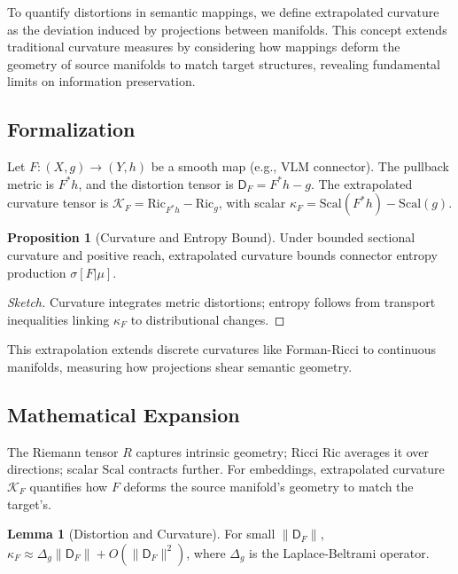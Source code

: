 \documentclass{article}
\theoremstyle{definition}
\newtheorem{lemma}[theorem]{Lemma}
\newtheorem{proposition}[theorem]{Proposition}
\begin{document}
To quantify distortions in semantic mappings, we define extrapolated curvature as the deviation induced by projections between manifolds. This concept extends traditional curvature measures by considering how mappings deform the geometry of source manifolds to match target structures, revealing fundamental limits on information preservation.

\subsection{Formalization}

Let $F: (X, g) \to (Y, h)$ be a smooth map (e.g., VLM connector). The pullback metric is $F^* h$, and the distortion tensor is $\mathsf{D}_F = F^* h - g$. The extrapolated curvature tensor is $\mathcal{K}_F = \mathrm{Ric}_{F^* h} - \mathrm{Ric}_g$, with scalar $\kappa_F = \mathrm{Scal}(F^* h) - \mathrm{Scal}(g)$.

\begin{proposition}[Curvature and Entropy Bound]
Under bounded sectional curvature and positive reach, extrapolated curvature bounds connector entropy production $\sigma[F|\mu]$.
\end{proposition}

\begin{proof}[Sketch]
Curvature integrates metric distortions; entropy follows from transport inequalities linking $\kappa_F$ to distributional changes.
\end{proof}

This extrapolation extends discrete curvatures like Forman-Ricci \cite{forman2003bochner} to continuous manifolds, measuring how projections shear semantic geometry.

\subsection{Mathematical Expansion}

The Riemann tensor $R$ captures intrinsic geometry; Ricci $\mathrm{Ric}$ averages it over directions; scalar $\mathrm{Scal}$ contracts further. For embeddings, extrapolated curvature $\mathcal{K}_F$ quantifies how $F$ deforms the source manifold's geometry to match the target's.

\begin{lemma}[Distortion and Curvature]
For small $\|\mathsf{D}_F\|$, $\kappa_F \approx \Delta_g \|\mathsf{D}_F\| + O(\|\mathsf{D}_F\|^2)$, where $\Delta_g$ is the Laplace-Beltrami operator.
\end{lemma}
\end{document}
